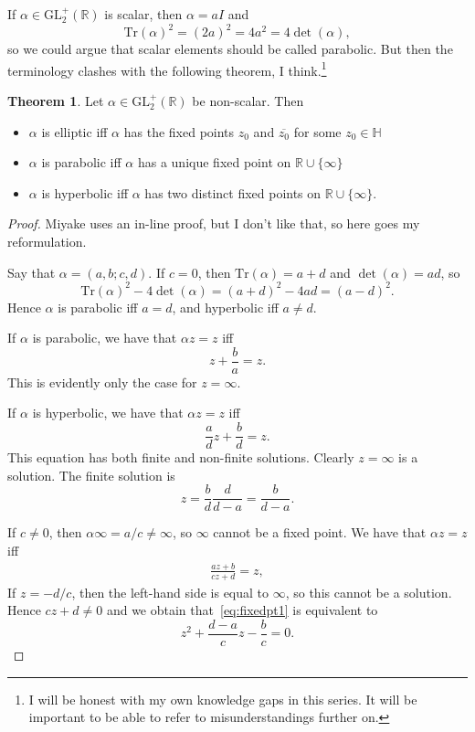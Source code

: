 \documentclass{article}
\theoremstyle{definition}
\newtheorem{theo}{Theorem}
\begin{document}
If $\alpha\in\mathrm{GL}_2^+(\mathbb{R})$ is scalar, then $\alpha=aI$ and
\[\mathrm{Tr}(\alpha)^2=(2a)^2=4a^2=4\det(\alpha),\]
so we could argue that scalar elements should be called parabolic. But then the terminology clashes with the following theorem, I think.\footnote{I will be honest with my own knowledge gaps in this series. It will be important to be able to refer to misunderstandings further on.}
\begin{theo}
	Let $\alpha\in\mathrm{GL}_2^+(\mathbb{R})$ be non-scalar. Then
	\begin{itemize}
		\item $\alpha$ is elliptic iff $\alpha$ has the fixed points $z_0$ and $\overline{z_0}$ for some $z_0\in\mathbb{H}$
		\item $\alpha$ is parabolic iff $\alpha$ has a unique fixed point on $\mathbb{R}\cup\{\infty\}$
		\item $\alpha$ is hyperbolic iff $\alpha$ has two distinct fixed points on $\mathbb{R}\cup\{\infty\}$.
	\end{itemize}
\end{theo}
\begin{proof}
	Miyake uses an in-line proof, but I don't like that, so here goes my reformulation.

	Say that $\alpha=(a,b;c,d)$. If $c=0$, then $\mathrm{Tr}(\alpha)=a+d$ and $\det(\alpha)=ad$, so
	\[\mathrm{Tr}(\alpha)^2-4\det(\alpha)=(a+d)^2-4ad=(a-d)^2.\]
	Hence $\alpha$ is parabolic iff $a=d$, and hyperbolic iff $a\neq d$.

	If $\alpha$ is parabolic, we have that $\alpha z=z$ iff
	\[z+\frac{b}{a}=z.\]
	This is evidently only the case for $z=\infty$.

	If $\alpha$ is hyperbolic, we have that $\alpha z=z$ iff
	\[\frac{a}{d}z+\frac{b}{d}=z.\]
	This equation has both finite and non-finite solutions. Clearly $z=\infty$ is a solution. The finite solution is
	\[z=\frac{b}{d}\frac{d}{d-a}=\frac{b}{d-a}.\]

	If $c\neq 0$, then $\alpha\infty=a/c\neq\infty$, so $\infty$ cannot be a fixed point. We have that $\alpha z=z$ iff
	\begin{align}
		\frac{az+b}{cz+d}=z,
		\label{eq:fixedpt1}
	\end{align}
	If $z=-d/c$, then the left-hand side is equal to $\infty$, so this cannot be a solution. Hence $cz+d\neq 0$ and we obtain that~\eqref{eq:fixedpt1} is equivalent to
	\[z^2+\frac{d-a}{c}z-\frac{b}{c}=0.\]
\end{proof}
\end{document}
